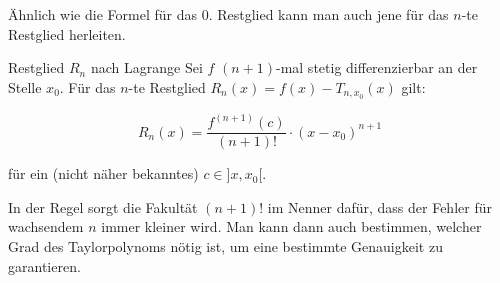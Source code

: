 

Ähnlich wie die Formel für das 0. Restglied kann man auch jene für das $n$-te Restglied herleiten.
\begin{satz}
	{Restglied $R_n$ nach Lagrange}{}
	Sei \( f \) \((n+1)\)-mal stetig differenzierbar an der Stelle \( x_0 \). Für das \( n \)-te Restglied \( R_n(x) = f(x) - T_{n,x_0}(x) \) gilt:

	\[ R_n(x) = \frac{f^{(n+1)}(c)}{(n+1)!} \cdot (x - x_0)^{n+1} \]

	für ein (nicht näher bekanntes) \( c \in ]x, x_0[ \).

\end{satz}

In der Regel sorgt die Fakultät $(n+1)!$ im Nenner dafür, dass der Fehler für wachsendem $n$ immer kleiner wird. Man kann dann auch bestimmen, welcher Grad des Taylorpolynoms nötig ist, um eine bestimmte Genauigkeit zu garantieren.

